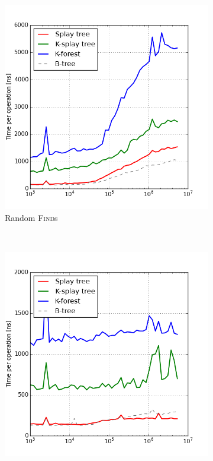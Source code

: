 \begin{figure}
\begin{subfigure}[b]{0.45\textwidth}
	\includegraphics[width=\textwidth]{img/performance/self-adj-random-find}
	\caption{Random \textsc{Find}s}
\end{subfigure}
~
\begin{subfigure}[b]{0.45\textwidth}
	\includegraphics[width=\textwidth]{img/performance/self-adj-ws-1k}

\end{subfigure}
\end{figure}
